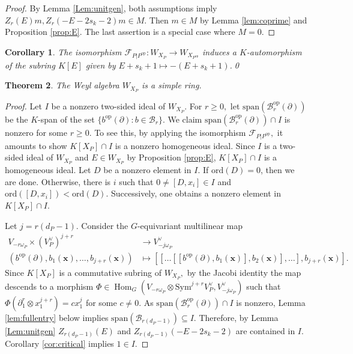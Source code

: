 \documentclass[11pt,a4paper,usenames,dvipsnames,reqno]{amsart}
\numberwithin{equation}{section}
\DeclareMathOperator{\Hom}{Hom}
\newtheorem{Thm}{Theorem}[section]
\newtheorem{Cor}[Thm]{Corollary}
\theoremstyle{definition}
\theoremstyle{remark}
\begin{document}
\begin{proof}
    By Lemma \ref{Lem:unitgen}, both assumptions imply $Z_r(E)m, Z_r(-E-2s_k-2)m\in M$. Then $m\in M$ by Lemma \ref{lem:coprime} and Proposition \ref{prop:E}. The last assertion is a special case where $M=0$.
\end{proof}

\begin{Cor}\label{cor:E}
The isomorphism  $\mathcal{F}_{P|P^{\mathrm{op}}}: W_{X_P}\longrightarrow W_{X_{P^{\mathrm{op}}}}$
induces a $K$-automorphism of the subring $K[E]$ given by $E+s_k+1\mapsto -(E+s_k+1)$.\qed
\end{Cor}


\begin{Thm}\label{thm:simple}
The Weyl algebra $W_{X_P}$ is a simple ring.
\end{Thm}

\begin{proof}
Let  $I$ be a nonzero two-sided ideal of $W_{X_P}$. For $r\ge 0,$ let $\mathrm{span}(\mathcal{B}_r^{\mathrm{op}}(\partial))$ be the $K$-span of the set $\{b^{\mathrm{op}}(\partial):b\in \mathcal{B}_r\}.$ We claim  $\mathrm{span}(\mathcal{B}_r^{\mathrm{op}}(\partial))\cap I$ is nonzero for some $r\ge 0$. To see this, by applying the isomorphism $\mathcal{F}_{P|P^{\mathrm{op}}},$ it amounts to show $K[X_P]\cap I$ is a nonzero homogeneous ideal. Since $I$ is a two-sided ideal of $W_{X_P}$ and $E\in W_{X_P}$ by Proposition \ref{prop:E}, $K[X_P]\cap I$ is a homogeneous ideal. Let $D$ be a nonzero element in $I$. If $\mathrm{ord}(D)=0$, then we are done. Otherwise, there is $i$ such that $0\neq [D,x_i]\in I$ and $\mathrm{ord}([D,x_i])<\mathrm{ord}(D)$. Successively, one obtains a nonzero element in $K[X_P]\cap I$. 

Let $j=r(d_P-1).$ Consider the $G$-equivariant multilinear map
 \begin{align*}
      V_{-r\omega_P}\times (V_P^\lor)^{j+r}&\to V^\lor_{-j\omega_P}\\
      (b^{\mathrm{op}}(\partial),b_1(\mathbf{x}),\ldots, b_{j+r}(\mathbf{x}))&\mapsto [[\ldots[[b^{\mathrm{op}}(\partial),b_1(\mathbf{x})],b_2(\mathbf{x})],\ldots], b_{j+r}(\mathbf{x})].
 \end{align*}
Since $K[X_P]$ is a commutative subring of $W_{X_P},$ by the Jacobi identity the map descends to a morphism $\Phi\in\Hom_G(V_{-r\omega_P}\otimes \mathrm{Sym}^{j+r} V_P^\lor, V_{-j\omega_P}^\lor)$ such that $\Phi(\partial_1^r \otimes x_1^{j+r})=c x_1^{j}$ for some $c\neq 0$.
As $\mathrm{span}(\mathcal{B}_r^{\mathrm{op}}(\partial))\cap I$ is nonzero, Lemma \ref{lem:fullentry} below implies $\mathrm{span}(\mathcal{B}_{r(d_P-1)})\subseteq I$. Therefore, by Lemma \ref{Lem:unitgen} $Z_{r(d_P-1)}(E)$ and $Z_{r(d_P-1)}(-E-2s_k-2)$ are contained in $I$. Corollary \ref{cor:critical} implies $1\in I$.
\end{proof}
\end{document}
